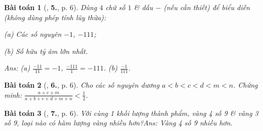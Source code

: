 \documentclass{article}
\numberwithin{equation}{section}
\newtheorem{baitoan}{Bài toán}
\begin{document}
\begin{baitoan}[\cite{Tuyen_Toan_7}, \textbf{5.}, p. 6]
	Dùng $4$ chữ số $1$ \& dấu $-$ (nếu cần thiết) để biểu diễn (không dùng phép tính lũy thừa):
	\begin{enumerate*}
		\item[(a)] Các số nguyên $-1$, $-111$;
		\item[(b)] Số hữu tỷ âm lớn nhất.
	\end{enumerate*}\hfill\textsf{Ans:} (a) $\frac{-11}{11} = -1$, $\frac{-111}{1} = -111$. (b) $\frac{-1}{111}$.
\end{baitoan}

\begin{baitoan}[\cite{Tuyen_Toan_7}, \textbf{6.}, p. 6]
	Cho các số nguyên dương $a < b < c < d < m < n$. Chứng minh: $\frac{a + c + m}{ a + b + c + d + m + n} < \frac{1}{2}$.
\end{baitoan}

\begin{baitoan}[\cite{Tuyen_Toan_7}, \textbf{7.}, p. 6]
	Với cùng 1 khối lượng thành phẩm, vàng 4 số 9 \& vàng 3 số 9, loại nào có hàm lượng vàng nhiều hơn?\hfill\textsf{Ans:} Vàng 4 số 9 nhiều hơn.
\end{baitoan}

\end{document}
